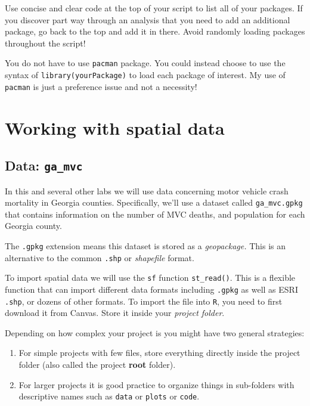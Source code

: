 \documentclass[
]{book}
\providecommand{\tightlist}{%
  \setlength{\itemsep}{0pt}\setlength{\parskip}{0pt}}
\newenvironment{rmdnote}[1]
  {
  \begin{itemize}
  \renewcommand{\labelitemi}{
    \raisebox{-.7\height}[0pt][0pt]{
      {\setkeys{Gin}{width=3em,keepaspectratio}\texttt{[image: images/\#1]}}
    }
  }
  \setlength{\fboxsep}{1em}
  \begin{note}
  \item
  }
  {
  \end{note}
  \end{itemize}
  }
\newenvironment{rmdtip}[1]
  {
  \begin{itemize}
  \renewcommand{\labelitemi}{
    \raisebox{-.7\height}[0pt][0pt]{
      {\setkeys{Gin}{width=3em,keepaspectratio}\texttt{[image: images/\#1]}}
    }
  }
  \setlength{\fboxsep}{1em}
  \begin{tip}
  \item
  }
  {
  \end{tip}
  \end{itemize}
  }
\begin{document}
\begin{rmdtip}{tip}
Use concise and clear code at the top of your script to list all of your packages. If you discover part way through an analysis that you need to add an additional package, go back to the top and add it in there. Avoid randomly loading packages throughout the script!

\end{rmdtip}

\begin{rmdnote}{note}
You do not have to use \texttt{pacman} package. You could instead choose to use the syntax of \texttt{library(yourPackage)} to load each package of interest. My use of \texttt{pacman} is just a preference issue and not a necessity!

\end{rmdnote}

\hypertarget{working-with-spatial-data}{%
\section{Working with spatial data}\label{working-with-spatial-data}}

\hypertarget{data-ga_mvc}{%
\subsection{\texorpdfstring{Data: \texttt{ga\_mvc}}{Data: ga\_mvc}}\label{data-ga_mvc}}

In this and several other labs we will use data concerning motor vehicle crash mortality in Georgia counties. Specifically, we'll use a dataset called \texttt{ga\_mvc.gpkg} that contains information on the number of MVC deaths, and population for each Georgia county.

The \texttt{.gpkg} extension means this dataset is stored as a \emph{geopackage.} This is an alternative to the common \texttt{.shp} or \emph{shapefile} format.

To import spatial data we will use the \texttt{sf} function \texttt{st\_read()}. This is a flexible function that can import different data formats including \texttt{.gpkg} as well as ESRI \texttt{.shp}, or dozens of other formats. To import the file into \texttt{R}, you need to first download it from Canvas. Store it inside your \emph{project folder}.

Depending on how complex your project is you might have two general strategies:

\begin{enumerate}
\def\labelenumi{\arabic{enumi}.}
\tightlist
\item
  For simple projects with few files, store everything directly inside the project folder (also called the project \textbf{root} folder).
\item
  For larger projects it is good practice to organize things in sub-folders with descriptive names such as \texttt{data} or \texttt{plots} or \texttt{code}.
\end{enumerate}
\end{document}
